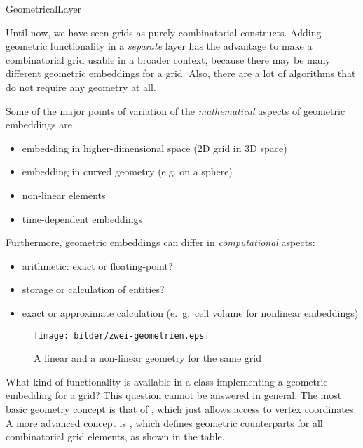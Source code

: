 
\begin{Label}{GeometricalLayer}
\end{Label}


Until now, we have seen grids as purely combinatorial constructs. 
Adding geometric functionality in a {\em separate\/} layer
has the advantage to make a combinatorial grid usable in a 
broader context, 
because there may be many different geometric embeddings for
a grid. 
Also, there are a lot of algorithms that do not require any geometry at all.

Some of the major points of variation of the \emph{mathematical\/} aspects
of geometric embeddings are
\begin{itemize}
\item  embedding in higher-dimensional space (2D grid in 3D space)
\item embedding in curved geometry (e.g. on a sphere)
\item non-linear elements
\item time-dependent embeddings 
\end{itemize}

Furthermore, geometric embeddings can differ in \emph{computational\/} aspects:
\begin{itemize}
\item arithmetic: exact or floating-point?
\item storage or calculation of entities?
\item exact or approximate calculation (e.\ g.\ cell volume
  for nonlinear embeddings)
\end{itemize}

   \begin{figure}[h]
     \begin{center}
       \T\texttt{[image: bilder/zwei-geometrien.eps]}
       \W{}
      \caption{A linear and a non-linear geometry for the same grid}
     \end{center}
   \end{figure}


What kind of functionality is available in a class implementing a 
geometric embedding for a grid?
This question cannot be answered in general.
The most basic geometry concept is that of ,
which just allows access to vertex coordinates.
A more advanced concept is 
,
which defines geometric counterparts for all combinatorial grid elements,
as shown in the table.

